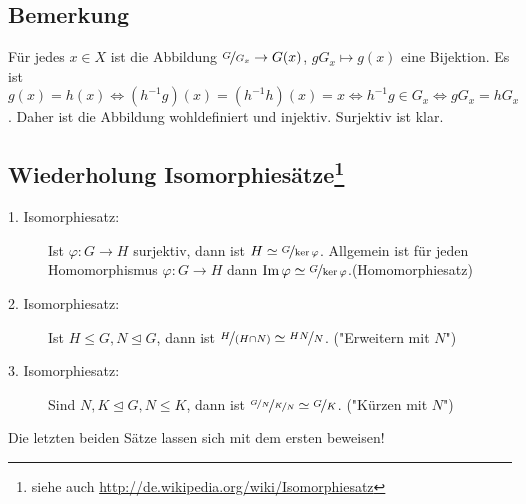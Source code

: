 \subsection[Bemerkung über eine Abbildung $\nicefrac{G}{G_x} \to G(x)$]{Bemerkung} %
\label{sub:12}
Für jedes $x \in X$ ist die Abbildung $\nicefrac{G}{G_x} \to G(x)$, $g G_x \mapsto g(x)$ eine Bijektion.
Es ist $g(x) = h(x) \iff (h ^{-1} g)(x)=(h^{-1}h)(x)=x \iff h ^{-1} g \in G_x \iff g G_x = h G_x$. Daher ist die Abbildung wohldefiniert und injektiv. Surjektiv ist klar. \bewende

\subsection*{Wiederholung Isomorphiesätze\footnote{siehe auch \url{http://de.wikipedia.org/wiki/Isomorphiesatz}}} %
\label{sub:wiederholung_iso}
\begin{description}
	\item[1. Isomorphiesatz:] Ist $\varphi : G \to H$ surjektiv, dann ist $H \simeq \nicefrac{G}{\ker \varphi}$. Allgemein ist für jeden Homomorphismus $\varphi : G \to H$
	dann $\operatorname{Im} \varphi \simeq \nicefrac{G}{\ker \varphi}$.\hfill {\color{lightgray}(Homomorphiesatz)}
	\item[2. Isomorphiesatz:] Ist $H \le G, N \unlhd G$, dann ist $\nicefrac{H}{(H \cap N)} \simeq \nicefrac{H N}{N}$.\hfill {\color{lightgray} ("{}Erweitern mit $N$")}
	\item[3. Isomorphiesatz:] Sind $N,K \unlhd G, N \le K$, dann ist $\nicefrac{\nicefrac{G}{N}}{\nicefrac{K}{N}} \simeq \nicefrac{G}{K}$. \hfill
	{\color{lightgray} ("{}Kürzen mit $N$")}
\end{description}
Die letzten beiden Sätze lassen sich mit dem ersten beweisen!

